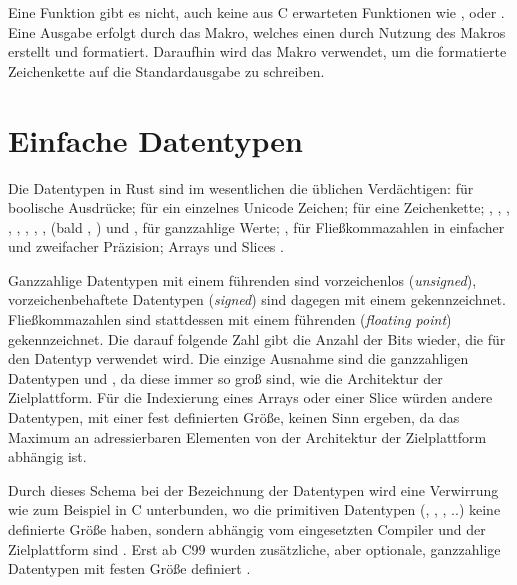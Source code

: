 Eine Funktion  gibt es nicht, auch keine aus C erwarteten Funktionen wie ,  oder .
Eine Ausgabe erfolgt durch das  Makro, welches einen  durch Nutzung des  Makros erstellt und formatiert.
Daraufhin wird das  Makro verwendet, um die formatierte Zeichenkette auf die Standardausgabe zu schreiben.

\section{Einfache Datentypen}
\label{rust:types:simple}

Die Datentypen in Rust sind im wesentlichen die üblichen  Verdächtigen:  für boolische Ausdrücke;  für ein einzelnes Unicode Zeichen;  für eine Zeichenkette; , , , , , , , , (bald ,  \cite{rust:github:128bit_integer:rfc}) und ,   für ganzzahlige Werte; ,  für Fließkommazahlen in einfacher und zweifacher Präzision; Arrays und Slices \cite{rust:book:primitives}.

Ganzzahlige Datentypen mit einem führenden  sind vorzeichenlos (\textit{unsigned}), vorzeichenbehaftete Datentypen (\textit{signed}) sind dagegen mit einem  gekennzeichnet.
Fließkommazahlen sind stattdessen mit einem führenden  (\textit{floating point}) gekennzeichnet.
Die darauf folgende Zahl gibt die Anzahl der Bits wieder, die für den Datentyp verwendet wird.
Die einzige Ausnahme sind die ganzzahligen Datentypen  und , da diese immer so groß sind, wie die Architektur der Zielplattform.
Für die Indexierung eines Arrays oder einer Slice würden andere Datentypen, mit einer fest definierten Größe, keinen Sinn ergeben, da das Maximum an adressierbaren Elementen von der Architektur der Zielplattform abhängig ist.

Durch dieses Schema bei der Bezeichnung der Datentypen wird eine Verwirrung wie zum Beispiel in C unterbunden, wo die primitiven Datentypen (, , , ..) keine definierte Größe haben, sondern abhängig vom eingesetzten Compiler und der Zielplattform sind \cite[187]{deitel2013c}. Erst ab C99 wurden zusätzliche, aber optionale, ganzzahlige Datentypen mit festen Größe definiert \cite[141]{goll2014c}.

